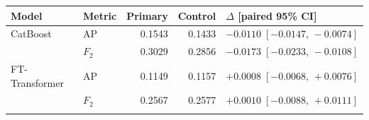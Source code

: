 \begingroup
\setlength{\tabcolsep}{3pt}
\begin{tabular}{l l r r l}
\toprule
Model & Metric & Primary & Control & $\Delta$ [paired 95\% CI] \\
\midrule
CatBoost & AP & 0.1543 & 0.1433 & $-0.0110\;[-0.0147,\,-0.0074]$ \\
 & $F_2$ & 0.3029 & 0.2856 & $-0.0173\;[-0.0233,\,-0.0108]$ \\
\addlinespace[3pt]
FT-Transformer & AP & 0.1149 & 0.1157 & $+0.0008\;[-0.0068,\,+0.0076]$ \\
 & $F_2$ & 0.2567 & 0.2577 & $+0.0010\;[-0.0088,\,+0.0111]$ \\
\addlinespace[3pt]
\bottomrule
\end{tabular}
\endgroup
